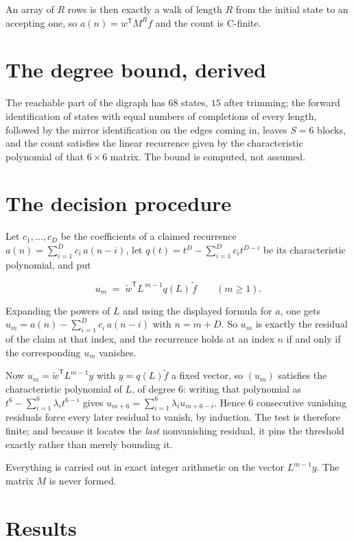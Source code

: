 \documentclass[11pt]{article}
\theoremstyle{definition}
\begin{document}
An array of $R$ rows is then exactly a walk of length $R$ from the initial state to an accepting one, so $a(n) = w^{\mathsf T}M^{R}f$ and the count is C-finite.

\section{The degree bound, derived}

The reachable part of the digraph has $68$ states, $15$ after trimming; the forward identification of states with equal numbers of completions of every length, followed by the mirror identification on the edges coming in, leaves $S = 6$ blocks, and the count satisfies the linear recurrence given by the characteristic polynomial of that $6\times6$ matrix. The bound is computed, not assumed.

\section{The decision procedure}

Let $c_1,\dots,c_D$ be the coefficients of a claimed recurrence $a(n) = \sum_{i=1}^{D} c_i\,a(n-i)$, let $q(t) = t^{D} - \sum_{i=1}^{D} c_i t^{D-i}$ be its characteristic polynomial, and put

\[u_m \;=\; \tilde w^{\mathsf T} L^{\,m-1} q(L)\,\tilde f \qquad (m \ge 1).\]

Expanding the powers of $L$ and using the displayed formula for $a$, one gets $u_m = a(n) - \sum_{i=1}^{D} c_i\,a(n-i)$ with $n = m + D$. So $u_m$ is exactly the residual of the claim at that index, and the recurrence holds at an index $n$ if and only if the corresponding $u_m$ vanishes.

Now $u_m = \tilde w^{\mathsf T} L^{m-1} y$ with $y = q(L)\tilde f$ a fixed vector, so $(u_m)$ satisfies the characteristic polynomial of $L$, of degree $6$: writing that polynomial as $t^{6} - \sum_{i=1}^{6} \lambda_i t^{6-i}$ gives $u_{m+6} = \sum_{i=1}^{6} \lambda_i u_{m+6-i}$. Hence $6$ consecutive vanishing residuals force every later residual to vanish, by induction. The test is therefore finite; and because it locates the {\itshape last} nonvanishing residual, it pins the threshold exactly rather than merely bounding it.

Everything is carried out in exact integer arithmetic on the vector $L^{m-1}y$. The matrix $M$ is never formed.

\section{Results}
\end{document}
